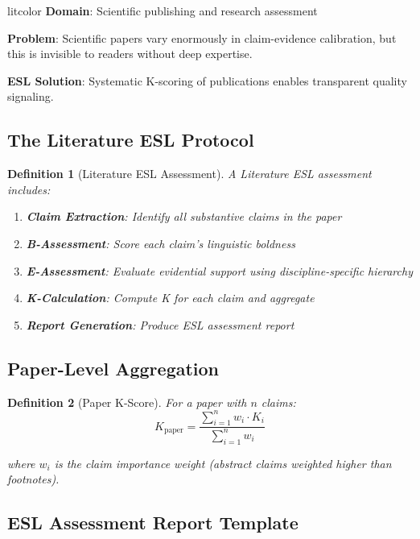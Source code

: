 \documentclass[11pt,a4paper]{article}
\newtheorem{definition}{Definition}[section]
\theoremstyle{remark}
\begin{document}
\begin{applicationbox}{litcolor}
\textbf{Domain}: Scientific publishing and research assessment

\textbf{Problem}: Scientific papers vary enormously in claim-evidence calibration, but this is invisible to readers without deep expertise.

\textbf{ESL Solution}: Systematic K-scoring of publications enables transparent quality signaling.
\end{applicationbox}

\subsection{The Literature ESL Protocol}

\begin{definition}[Literature ESL Assessment]
\label{def:lit-esl}
A Literature ESL assessment includes:
\begin{enumerate}
    \item \textbf{Claim Extraction}: Identify all substantive claims in the paper
    \item \textbf{B-Assessment}: Score each claim's linguistic boldness
    \item \textbf{E-Assessment}: Evaluate evidential support using discipline-specific hierarchy
    \item \textbf{K-Calculation}: Compute K for each claim and aggregate
    \item \textbf{Report Generation}: Produce ESL assessment report
\end{enumerate}
\end{definition}

\subsection{Paper-Level Aggregation}

\begin{definition}[Paper K-Score]
\label{def:paper-k}
For a paper with $n$ claims:
\begin{equation}
K_{\text{paper}} = \frac{\sum_{i=1}^{n} w_i \cdot K_i}{\sum_{i=1}^{n} w_i}
\end{equation}

where $w_i$ is the claim importance weight (abstract claims weighted higher than footnotes).
\end{definition}

\subsection{ESL Assessment Report Template}
\end{document}
